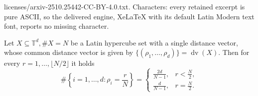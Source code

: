 \documentclass[10pt,a4paper]{amsart}
\newcommand{\bbT}{\mathbb{T}}
\newcommand{\dv}{\operatorname{dv}}
\newcommand{\sbse}{\subseteq}
\begin{document}
licenses/arxiv-2510.25442-CC-BY-4.0.txt. Characters: every retained excerpt is pure ASCII, so the delivered engine, XeLaTeX with its default Latin Modern text font, reports no missing character.
\begin{lem} \label{lem:double_counting}
    Let $X \sbse \bbT^d, \#X=N$ be a Latin hypercube set with a  single distance vector, whose common distance vector is given by $\{(\rho_1, \dots, \rho_d)\} = \dv(X)$. Then for every $r = 1, \dots, \lfloor N/2 \rfloor$ it holds
    $$
    \#\left\{i=1, \dots, d: \rho_i = \frac rN\right\} =  \begin{cases}
        \frac{2d}{N-1}, & r < \frac N2, \\
        \frac d{N-1}, &  r = \frac N2.
    \end{cases}
    $$
\end{lem}
\end{document}
